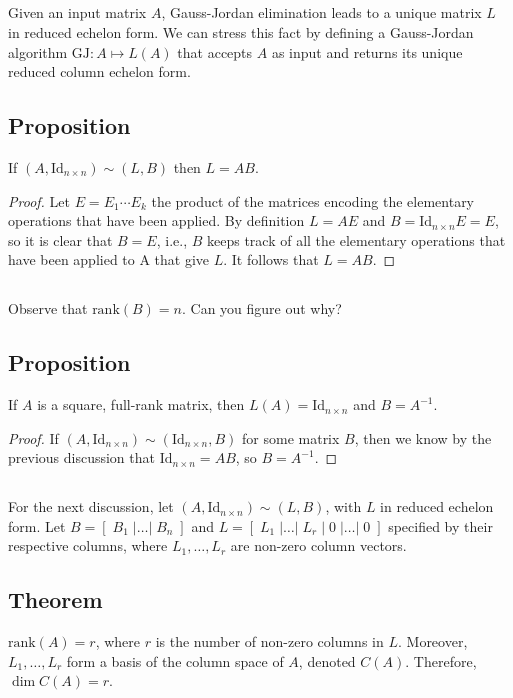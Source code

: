 \documentclass{proc-l}
\theoremstyle{definition}
\theoremstyle{remark}
\numberwithin{equation}{section}
\newcommand{\rank}[1]{\textrm{rank}({#1})}
\newcommand{\id}[1]{\textrm{Id}_{{#1}\times {#1}}}
\begin{document}
\subsection{}
Given an input matrix $A$, Gauss-Jordan elimination leads to a unique matrix $L$ in reduced echelon form. We can stress this fact by defining a Gauss-Jordan algorithm $\textrm{GJ}: A\mapsto L(A)$ that accepts $A$ as input and returns its unique reduced column echelon form.

\subsection{Proposition}
If $(A, \id{n}) \sim (L, B)$ then $L=AB$.
\begin{proof}
Let $E = E_1\cdots E_k$ the product of the matrices encoding the elementary operations that have been applied. By definition $L = AE$ and $B = \id{n} E = E$, so it is clear that $B=E$, i.e., $B$ keeps track of all the elementary operations that have been applied to A that give $L$. It follows that $L=AB$.
\end{proof}

\subsection{}
Observe that $\rank{B} = n$. Can you figure out why?

\subsection{Proposition}
If $A$ is a square, full-rank matrix, then $L(A) = \id{n}$ and $B=A^{-1}$.
\begin{proof}
If $(A, \id{n}) \sim (\id{n}, B)$ for some matrix $B$, then we know by the previous discussion that $\id{n} = AB$, so $B=A^{-1}$.
\end{proof}

\subsection{}
For the next discussion, let $(A, \id{n}) \sim (L, B)$, with $L$ in reduced echelon form. Let $B=[\;B_1 \;| \ldots |\; B_n\;]$ and $L=[\;L_1\;|\ldots|\; L_r\;|\;0\;|\ldots|\;0\;]$ specified by their respective columns, where $L_1,\ldots,L_r$ are non-zero column vectors.

\subsection{Theorem}
$\rank{A} = r$, where $r$ is the number of non-zero columns in $L$. Moreover, $L_1,\ldots,L_r$ form a basis of the column space of $A$, denoted $C(A)$. Therefore, $\dim{C(A)} = r$.
\end{document}
